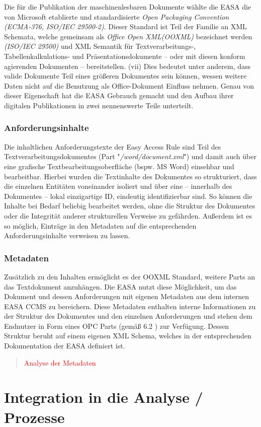             Die für die Publikation der maschinenlesbaren Dokumente wählte die EASA die von Microsoft etablierte und standardisierte \textit{Open Packaging Convention (ECMA-376, ISO/IEC 29500-2)}.
            Dieser Standard ist Teil der Familie an XML Schemata, welche gemeinsam als \textit{Office Open XML(OOXML)} bezeichnet werden \textit{(ISO/IEC 29500)} und XML Semantik für Textverarbeitungs-, Tabellenkalkulations- und Präsentationsdokumente -- oder mit diesen konform agierenden Dokumenten -- bereitstellen.  \cite{easa_opc_iso}(vii) 
            Dies bedeutet unter anderem, dass valide Dokumente Teil eines größeren Dokumentes sein können, wessen weitere Daten nicht auf die Benutzung als Office-Dokument Einfluss nehmen.
            Genau von dieser Eigenschaft hat die EASA Gebrauch gemacht und den Aufbau ihrer digitalen Publikationen in zwei nennenswerte Teile unterteilt.   

            \subsubsection{Anforderungsinhalte}

            Die inhaltlichen Anforderungstexte der Easy Access Rule sind Teil des Textverarbeitungsdokumentes (Part "\textit{/word/document.xml}") und damit auch über eine grafische Textbearbeitungsoberfläche (bspw. MS Word) einsehbar und bearbeitbar.
            Hierbei wurden die Textinhalte des Dokumentes so strukturiert, dass die einzelnen Entitäten voneinander isoliert und über eine -- innerhalb des Dokumentes -- lokal einzigartige ID, eindeutig identifizierbar sind.
            So können die Inhalte bei Bedarf beliebig bearbeitet werden, ohne die Struktur des Dokumentes oder die Integrität anderer strukturellen Verweise zu gefährden.
            Außerdem ist es so möglich, Einträge in den Metadaten auf die entsprechenden Anforderungsinhalte verweisen zu lassen. 

            \pagebreak
            \subsubsection{Metadaten}

            Zusätzlich zu den Inhalten ermöglicht es der OOXML Standard, weitere Parts an das Textdokument anzuhängen.
            Die EASA nutzt diese Möglichkeit, um das Dokument und dessen Anforderungen mit eigenen Metadaten aus dem internen EASA CCMS zu bereichern.
            Diese Metadaten enthalten interne Informationen zu der Struktur des Dokumentes und den einzelnen Anforderungen und stehen dem Endnutzer in Form eines OPC Parts (gemäß 6.2 \cite{easa_opc_iso}) zur Verfügung.
            Dessen Struktur beruht auf einem eigenen XML Schema, welches in der entsprechenden Dokumentation der EASA definiert ist.

            

\begin{quote}
\textcolor{red}{Analyse der Metadaten}
\end{quote}
        
    \pagebreak
    \section{Integration in die Analyse / Prozesse}